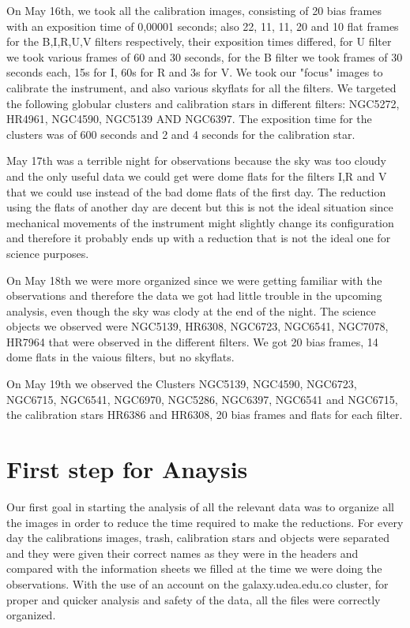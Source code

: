 On May 16th, we took all the calibration images, consisting of 20 bias frames with an exposition time of 0,00001 seconds; also 22, 11, 11, 20 and 10 flat frames for the B,I,R,U,V filters respectively, their exposition times differed, for  U filter we took various frames of 60 and 30 seconds, for the B filter we took frames of 30 seconds each, 15s for I, 60s for R and 3s for V. We took our "focus" images to calibrate the instrument, and also various skyflats for all the filters. We targeted the following globular clusters and calibration stars in different filters: NGC5272, HR4961, NGC4590, NGC5139 AND NGC6397. The exposition time for the clusters was of 600 seconds and 2 and 4 seconds for the calibration star. 

May 17th was a terrible night for observations because the sky was too cloudy and the only useful data we could get were dome flats for the filters I,R and V that we could use instead of the bad dome flats of the first day. The reduction using the flats of another day are decent but this is not the ideal situation since mechanical movements of the instrument might slightly change its configuration and therefore it probably ends up with a reduction that is not the ideal one for science purposes.  

On May 18th we were more organized since we were getting familiar with the observations and therefore the data we got had little trouble in the upcoming analysis, even though the sky was clody at the end of the night. The science objects we observed were NGC5139, HR6308, NGC6723, NGC6541, NGC7078, HR7964 that were observed in the different filters. We got 20 bias frames, 14 dome flats in the vaious filters, but no skyflats. 

On May 19th we observed the Clusters NGC5139, NGC4590, NGC6723, NGC6715, NGC6541, NGC6970, NGC5286,    NGC6397, NGC6541 and NGC6715, the calibration stars HR6386 and HR6308, 20 bias frames and flats for each filter.

\section{First step for Anaysis}

Our first goal in starting the analysis of all the relevant data was to organize all the images in order to reduce the time required to make the reductions. For every day the calibrations images, trash, calibration stars and objects were separated and they were given their correct names as they were in the headers and compared with the information sheets we filled at the time we were doing the observations. With the use of an account on the galaxy.udea.edu.co cluster, for proper and quicker analysis and safety of the data, all the files were correctly organized.


